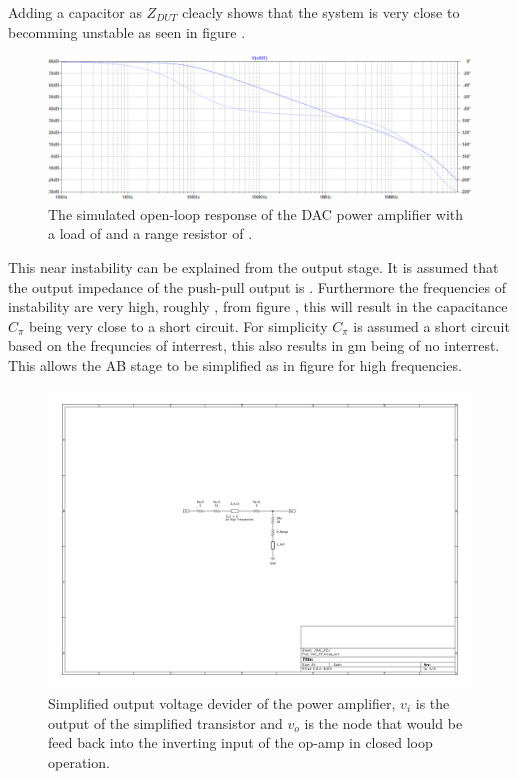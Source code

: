 Adding a  capacitor as $Z_{DUT}$ cleacly shows that the system is very close to becomming unstable as seen in figure .

\begin{figure}[H]
    \centering
    \includegraphics[clip, trim=0 0 0 0, width=1\textwidth]{Sections/7_SystemDesign/Figures/7_1_1_5_DAC_PWR_AMP_150PF.pdf}
    \caption{The simulated open-loop response of the DAC power amplifier with a load  of  and a range resistor of .}
    \label{fig_7_1_1_5_DAC_POWER_AMP_SIM_150PF}
\end{figure}

This near instability can be explained from the output stage. It is assumed that the output impedance of the push-pull output is . Furthermore the frequencies of instability are very high, roughly , from figure , this will result in the capacitance $C_\pi$ being very close to a short circuit. For simplicity $C_\pi$ is assumed a short circuit based on the frequncies of interrest, this also results in gm being of no interrest. This allows the AB stage to be simplified as in figure  for high frequencies. 

\begin{figure}[H]
    \centering
    \includegraphics[clip, trim=260 240 280 220, width=1\textwidth]{Sections/7_SystemDesign/Figures/7_1_1_5_DAC_FILTER_DAC_PZ.pdf}
    \caption{Simplified output voltage devider of the power amplifier, $v_i$ is the output of the simplified transistor and $v_o$ is the node that would be feed back into the inverting input of the op-amp in closed loop operation.}
    \label{fig_7_1_1_5_DAC_PWR_AMP_PZ}
\end{figure}

